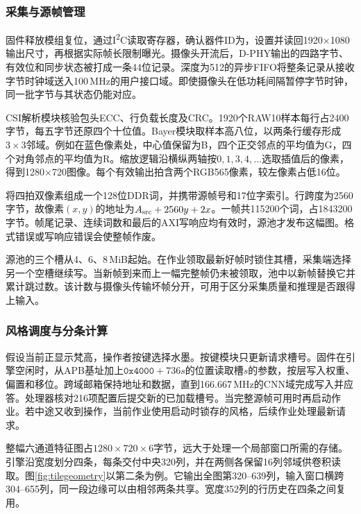 \subsubsection{采集与源帧管理}
固件释放模组复位，通过I\textsuperscript{2}C读取寄存器，确认器件ID为，设置并读回1920×1080输出尺寸，再根据实际帧长限制曝光。摄像头开流后，D-PHY输出的四路字节、有效位和同步状态被打成一条44位记录。深度为512的异步FIFO将整条记录从接收字节时钟域送入100\,MHz的用户接口域。即使摄像头在低功耗间隔暂停字节时钟，同一批字节与其状态仍能对应。

CSI解析模块核验包头ECC、行负载长度及CRC。1920个RAW10样本每行占2400字节，每五字节还原四个十位值。Bayer模块取样本高八位，以两条行缓存形成$3\times3$邻域。例如在蓝色像素处，中心值保留为B，四个正交邻点的平均值为G，四个对角邻点的平均值为R。缩放逻辑沿横纵两轴按$0,1,3,4,\ldots$选取插值后的像素，得到1280×720图像。每个有效输出拍含两个RGB565像素，较左像素占低16位。

将四拍双像素组成一个128位DDR词，并携带源帧号和17位字索引。行跨度为2560字节，故像素$(x,y)$的地址为$A_{\rm src}+2560y+2x$。一帧共115200个词，占1843200字节。帧尾记录、连续词数和最后的AXI写响应均有效时，源池才发布这幅图。格式错误或写响应错误会使整帧作废。

源池的三个槽从4、6、8\,MiB起始。在作业领取最新好帧时锁住其槽，采集端选择另一个空槽继续写。当新帧到来而上一幅完整帧仍未被领取，池中以新帧替换它并累计跳过数。该计数与摄像头传输坏帧分开，可用于区分采集质量和推理是否跟得上输入。

\subsubsection{风格调度与分条计算}
假设当前正显示梵高，操作者按键选择水墨。按键模块只更新请求槽号。固件在引擎空闲时，从APB基址加上$\mathtt{0x4000}+736s$的位置读取槽$s$的参数，按层写入权重、偏置和移位。跨域邮箱保持地址和数据，直到166.667\,MHz的CNN域完成写入并应答。处理器核对216项配置后提交新的已加载槽号。当完整源帧可用时再启动作业。若中途又收到操作，当前作业使用启动时锁存的风格，后续作业处理最新请求。

整幅六通道特征图占$1280\times720\times6$字节，远大于处理一个局部窗口所需的存储。引擎沿宽度划分四条，每条交付中央320列，并在两侧各保留16列邻域供卷积读取。图\ref{fig:tilegeometry}以第二条为例。它输出全图第320--639列，输入窗口横跨304--655列，同一段边缘可以由相邻两条共享。宽度352列的行历史在四条之间复用。

